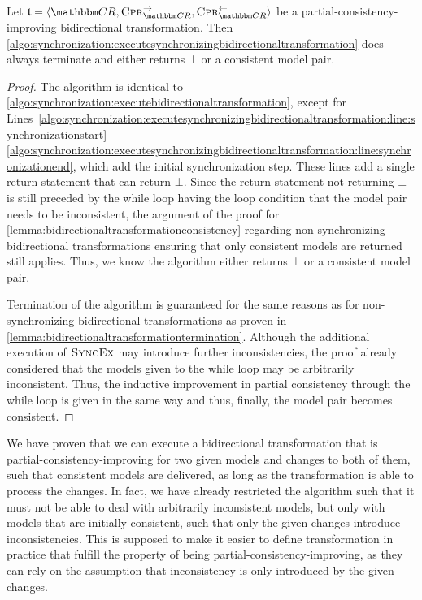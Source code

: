\begin{theorem}[Synchronizing Transformation Termination] %
    \label{theorem:synchronizingbidirectionaltransformationconsistencytermination}
    Let $\transformation{t} = \tupled{\consistencyrelationset{CR}, \consistencypreservationrule{\consistencyrelationset{CR}}^{\rightarrow}, \consistencypreservationrule{\consistencyrelationset{CR}}^{\leftarrow}}$ be a partial-consistency-improving bidirectional transformation.
    Then \autoref{algo:synchronization:executesynchronizingbidirectionaltransformation} does always terminate and either returns $\bot$ or a consistent model pair.
\end{theorem}
\begin{proof}
    The algorithm is identical to \autoref{algo:synchronization:executebidirectionaltransformation}, except for Lines~\ref{algo:synchronization:executesynchronizingbidirectionaltransformation:line:synchronizationstart}--\ref{algo:synchronization:executesynchronizingbidirectionaltransformation:line:synchronizationend}, which add the initial synchronization step.
    These lines add a single return statement that can return $\bot$.
    Since the return statement not returning $\bot$ is still preceded by the while loop having the loop condition that the model pair needs to be inconsistent, the argument of the proof for \autoref{lemma:bidirectionaltransformationconsistency} regarding non-synchronizing bidirectional transformations ensuring that only consistent models are returned still applies.
    Thus, we know the algorithm either returns $\bot$ or a consistent model pair.

    Termination of the algorithm is guaranteed for the same reasons as for non-synchronizing bidirectional transformations as proven in \autoref{lemma:bidirectionaltransformationtermination}.
    Although the additional execution of $\textsc{SyncEx}$ may introduce further inconsistencies, the proof already considered that the models given to the while loop may be arbitrarily inconsistent.
    Thus, the inductive improvement in partial consistency through the while loop is given in the same way and thus, finally, the model pair becomes consistent.
\end{proof}

We have proven that we can execute a bidirectional transformation that is partial-consistency-improving for two given models and changes to both of them, such that consistent models are delivered, as long as the transformation is able to process the changes.
In fact, we have already restricted the algorithm such that it must not be able to deal with arbitrarily inconsistent models, but only with models that are initially consistent, such that only the given changes introduce inconsistencies.
This is supposed to make it easier to define transformation in practice that fulfill the property of being partial-consistency-improving, as they can rely on the assumption that inconsistency is only introduced by the given changes.

